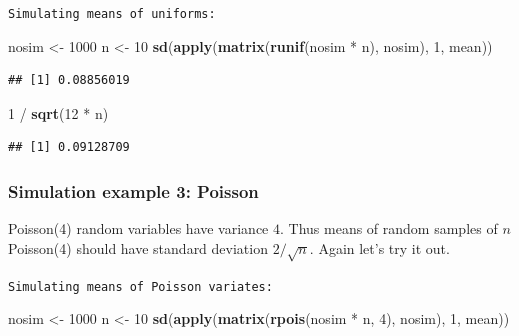 \documentclass[]{article}
\newenvironment{Shaded}{\begin{snugshade}}{\end{snugshade}}
\newcommand{\KeywordTok}[1]{\textcolor[rgb]{0.13,0.29,0.53}{\textbf{{#1}}}}
\newcommand{\DecValTok}[1]{\textcolor[rgb]{0.00,0.00,0.81}{{#1}}}
\newcommand{\StringTok}[1]{\textcolor[rgb]{0.31,0.60,0.02}{{#1}}}
\newcommand{\NormalTok}[1]{{#1}}
\begin{document}
\vspace{1pc}

\verb;Simulating means of uniforms:;

\begin{Shaded}
\begin{Highlighting}[]
\NormalTok{nosim <-}\StringTok{ }\DecValTok{1000}
\NormalTok{n <-}\StringTok{ }\DecValTok{10}
\KeywordTok{sd}\NormalTok{(}\KeywordTok{apply}\NormalTok{(}\KeywordTok{matrix}\NormalTok{(}\KeywordTok{runif}\NormalTok{(nosim *}\StringTok{ }\NormalTok{n), nosim), }\DecValTok{1}\NormalTok{, mean))}
\end{Highlighting}
\end{Shaded}

\begin{verbatim}
## [1] 0.08856019
\end{verbatim}

\begin{Shaded}
\begin{Highlighting}[]
\DecValTok{1} \NormalTok{/}\StringTok{ }\KeywordTok{sqrt}\NormalTok{(}\DecValTok{12} \NormalTok{*}\StringTok{ }\NormalTok{n)}
\end{Highlighting}
\end{Shaded}

\begin{verbatim}
## [1] 0.09128709
\end{verbatim}

\subsubsection{Simulation example 3:
Poisson}\label{simulation-example-3-poisson}

Poisson(4) random variables have variance $4$. Thus means of random
samples of $n$ Poisson(4) should have standard deviation $2/\sqrt{n}$.
Again let's try it out.

\vspace{1pc}

\verb;Simulating means of Poisson variates:;

\begin{Shaded}
\begin{Highlighting}[]
\NormalTok{nosim <-}\StringTok{ }\DecValTok{1000}
\NormalTok{n <-}\StringTok{ }\DecValTok{10}
\KeywordTok{sd}\NormalTok{(}\KeywordTok{apply}\NormalTok{(}\KeywordTok{matrix}\NormalTok{(}\KeywordTok{rpois}\NormalTok{(nosim *}\StringTok{ }\NormalTok{n, }\DecValTok{4}\NormalTok{), nosim), }\DecValTok{1}\NormalTok{, mean))}
\end{Highlighting}
\end{Shaded}
\end{document}
